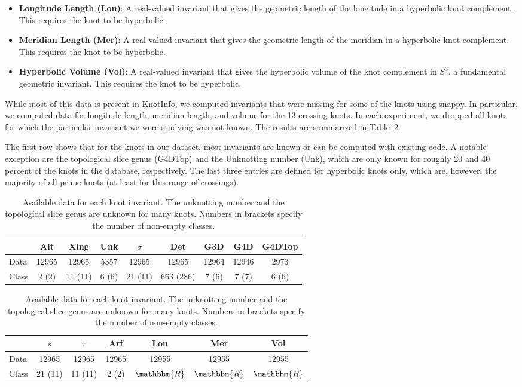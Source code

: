 \documentclass[11pt]{article}
\numberwithin{equation}{section}
\begin{document}
\begin{itemize}
    \item \textbf{Longitude Length (Lon)}: A real-valued invariant that gives the geometric length of the longitude in a hyperbolic knot complement. This requires the knot to be hyperbolic.
    \item \textbf{Meridian Length (Mer)}:  A real-valued invariant that gives the geometric length of the meridian in a hyperbolic knot complement. This requires the knot to be hyperbolic.
    \item \textbf{Hyperbolic Volume (Vol)}: A real-valued invariant that gives the hyperbolic volume of the knot complement in $S^3$, a fundamental geometric invariant.  This requires the knot to be hyperbolic.
\end{itemize}

While most of this data is present in KnotInfo, we computed invariants that were missing for some of the knots using snappy. In particular, we computed data for longitude length, meridian length, and volume for the 13 crossing knots. In each experiment, we dropped all knots for which the particular invariant we were studying was not known. The results are summarized in Table~\ref{tab:DatasetInfo}. 

The first row shows that for the knots in our dataset, most invariants are known or can be computed with existing code. A notable exception are the topological slice genus (G4DTop) and the Unknotting number (Unk), which are only known for roughly 20 and 40 percent of the knots in the database, respectively. The last three entries are defined for hyperbolic knots only, which are, however, the majority of all prime knots (at least for this range of crossings). 

\begin{table}[t]
\centering
\begin{tabular}{|l|cccccccc|}
\hline
 & Alt & Xing & Unk & $\sigma$ & Det  & G3D & G4D & G4DTop \\
\hline
Data & 12965 & 12965 & 5357 & 12965 & 12965 & 12964 & 12946 & 2973 \\
Class & 2 (2) & 11 (11) & 6 (6) & 21 (11) & 663 (286) & 7 (6) & 7 (7) & 6 (6) \\
\hline
\end{tabular}

\vspace{3mm}

\begin{tabular}{|l|cccccc|}
\hline
 & $s$ & $\tau$ & Arf & Lon & Mer & Vol  \\
\hline
Data & 12965 & 12965 & 12965 & 12955 & 12955 & 12955 \\
Class & 21 (11) & 11 (11) & 2 (2) & $\mathbbm{R}$ & $\mathbbm{R}$ & $\mathbbm{R}$ \\
\hline
\end{tabular}
\caption{Available data for each knot invariant. The unknotting number and the topological slice genus are unknown for many knots. Numbers in brackets specify the number of non-empty classes.}
\label{tab:DatasetInfo}
\end{table}
\end{document}
